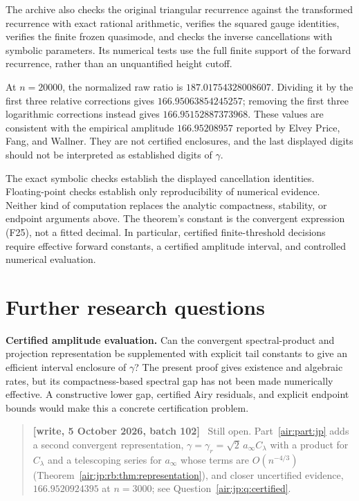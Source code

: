 \documentclass[11pt,letterpaper]{article}
\numberwithin{equation}{section}
\theoremstyle{remark}
\newenvironment{writenotejp}{\par\smallskip\begin{quote}\small\textbf{[write, 5 October 2026, batch 102]}\ }{\end{quote}\smallskip}
\begin{document}
The archive also checks the original triangular recurrence against the transformed recurrence with exact rational arithmetic, verifies the squared gauge identities, verifies the finite frozen quasimode, and checks the inverse cancellations with symbolic parameters. Its numerical tests use the full finite support of the forward recurrence, rather than an unquantified height cutoff.

At \(n=20000\), the normalized raw ratio is \(187.01754328008607\). Dividing it by the first three relative corrections gives \(166.95063854245257\); removing the first three logarithmic corrections instead gives \(166.95152887373968\). These values are consistent with the empirical amplitude \(166.95208957\) reported by Elvey Price, Fang, and Wallner. They are not certified enclosures, and the last displayed digits should not be interpreted as established digits of \(\gamma\).

The exact symbolic checks establish the displayed cancellation identities. Floating-point checks establish only reproducibility of numerical evidence. Neither kind of computation replaces the analytic compactness, stability, or endpoint arguments above. The theorem's constant is the convergent expression (F25), not a fitted decimal. In particular, certified finite-threshold decisions require effective forward constants, a certified amplitude interval, and controlled numerical evaluation.

\section{Further research questions}\label{air:rb:further-research-questions}

\textbf{Certified amplitude evaluation.} Can the convergent spectral-product and projection representation be supplemented with explicit tail constants to give an efficient interval enclosure of \(\gamma\)? The present proof gives existence and algebraic rates, but its compactness-based spectral gap has not been made numerically effective. A constructive lower gap, certified Airy residuals, and explicit endpoint bounds would make this a concrete certification problem.
\begin{writenotejp}
Still open. Part~\ref{air:part:jp} adds a second convergent representation, $\gamma=\gamma_r=\sqrt2\,a_\infty C_\lambda$ with a product for $C_\lambda$ and a telescoping series for $a_\infty$ whose terms are $O(n^{-4/3})$ (Theorem~\ref{air:jp:rb:thm:representation}), and closer uncertified evidence, $166.9520924395$ at $n=3000$; see Question~\ref{air:jp:q:certified}.
\end{writenotejp}
\end{document}
